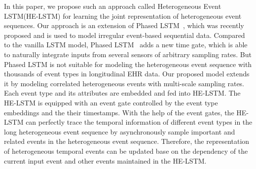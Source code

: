 \documentclass[letterpaper]{article} %
\begin{document}






In this paper, we propose such an approach called Heterogeneous Event LSTM(HE-LSTM) for learning the joint representation of heterogeneous event sequences. Our approach is an extension of Phased LSTM~\cite{neil2016phased}, which was recently proposed and is used to model irregular event-based sequential data. Compared to the vanilla LSTM model, Phased LSTM~\cite{neil2016phased}  adds a new time gate, which is able to naturally integrate inputs from several sensors of arbitrary sampling rates. But Phased LSTM is not suitable for modeling the heterogeneous event sequence with thousands of event types in longitudinal EHR data. Our proposed model extends it by modeling correlated heterogeneous events with multi-scale sampling rates.
Each event type and its attributes are embedded and fed into HE-LSTM. The HE-LSTM is equipped with an event gate controlled by the event type embeddings and the their timestamps.
With the help of the event gates, the HE-LSTM can perfectly trace the temporal information of different event types in the long heterogeneous event sequence
by asynchronously sample important and related events in the heterogeneous event sequence.
Therefore, the representation of heterogeneous temporal events can be updated base on the dependency of the current input event and other events maintained in the HE-LSTM.
\end{document}
